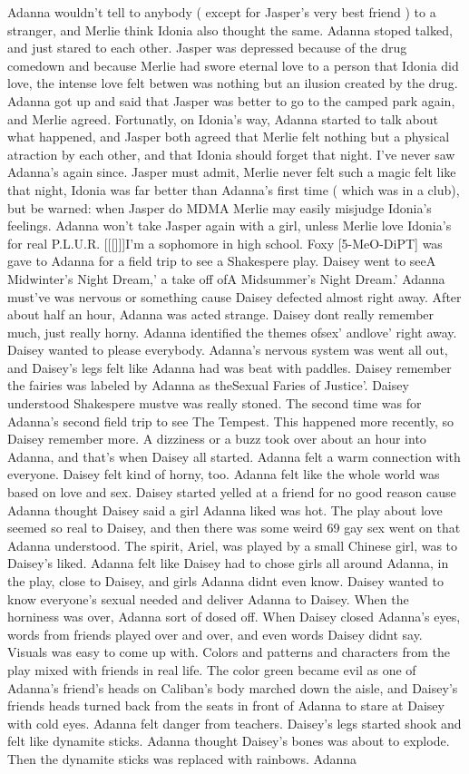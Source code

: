 \documentclass[12pt]{book}
\begin{document}
Adanna wouldn't tell to anybody ( except for Jasper's very best friend ) to a stranger, and Merlie think Idonia also thought the same. Adanna stoped talked, and just stared to each other. Jasper was depressed because of the drug comedown and because Merlie had swore eternal love to a person that Idonia did love, the intense love felt betwen was nothing but an ilusion created by the drug. Adanna got up and said that Jasper was better to go to the camped park again, and Merlie agreed. Fortunatly, on Idonia's way, Adanna started to talk about what happened, and Jasper both agreed that Merlie felt nothing but a physical atraction by each other, and that Idonia should forget that night. I've never saw Adanna's again since. Jasper must admit, Merlie never felt such a magic felt like that night, Idonia was far better than Adanna's first time ( which was in a club), but be warned: when Jasper do MDMA Merlie may easily misjudge Idonia's feelings. Adanna won't take Jasper again with a girl, unless Merlie love Idonia's for real P.L.U.R. [[[]]]I'm a sophomore in high school. Foxy [5-MeO-DiPT] was gave to Adanna for a field trip to see a Shakespere play. Daisey went to seeA Midwinter's Night Dream,' a take off ofA Midsummer's Night Dream.' Adanna must've was nervous or something cause Daisey defected almost right away. After about half an hour, Adanna was acted strange. Daisey dont really remember much, just really horny. Adanna identified the themes ofsex' andlove' right away. Daisey wanted to please everybody. Adanna's nervous system was went all out, and Daisey's legs felt like Adanna had was beat with paddles. Daisey remember the fairies was labeled by Adanna as theSexual Faries of Justice'. Daisey understood Shakespere mustve was really stoned. The second time was for Adanna's second field trip to see The Tempest. This happened more recently, so Daisey remember more. A dizziness or a buzz took over about an hour into Adanna, and that's when Daisey all started. Adanna felt a warm connection with everyone. Daisey felt kind of horny, too. Adanna felt like the whole world was based on love and sex. Daisey started yelled at a friend for no good reason cause Adanna thought Daisey said a girl Adanna liked was hot. The play about love seemed so real to Daisey, and then there was some weird 69 gay sex went on that Adanna understood. The spirit, Ariel, was played by a small Chinese girl, was to Daisey's liked. Adanna felt like Daisey had to chose girls all around Adanna, in the play, close to Daisey, and girls Adanna didnt even know. Daisey wanted to know everyone's sexual needed and deliver Adanna to Daisey. When the horniness was over, Adanna sort of dosed off. When Daisey closed Adanna's eyes, words from friends played over and over, and even words Daisey didnt say. Visuals was easy to come up with. Colors and patterns and characters from the play mixed with friends in real life. The color green became evil as one of Adanna's friend's heads on Caliban's body marched down the aisle, and Daisey's friends heads turned back from the seats in front of Adanna to stare at Daisey with cold eyes. Adanna felt danger from teachers. Daisey's legs started shook and felt like dynamite sticks. Adanna thought Daisey's bones was about to explode. Then the dynamite sticks was replaced with rainbows. Adanna 
\end{document}

